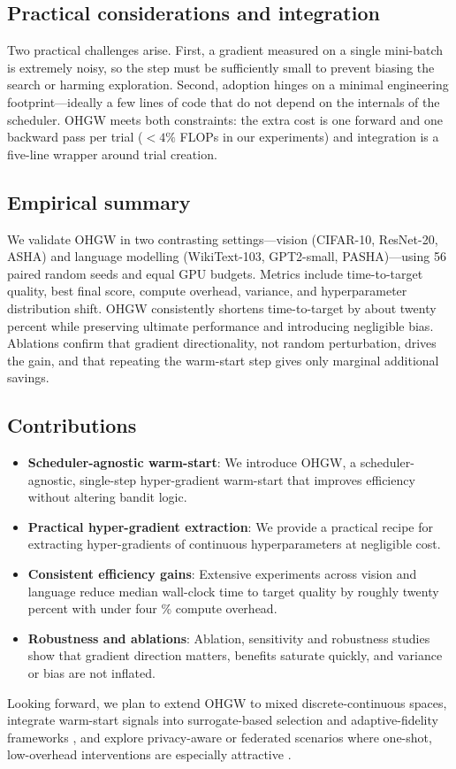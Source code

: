 \documentclass{article}
\begin{document}
\subsection{Practical considerations and integration}
Two practical challenges arise. First, a gradient measured on a single mini-batch is extremely noisy, so the step must be sufficiently small to prevent biasing the search or harming exploration. Second, adoption hinges on a minimal engineering footprint—ideally a few lines of code that do not depend on the internals of the scheduler. OHGW meets both constraints: the extra cost is one forward and one backward pass per trial (\(<4 \%\) FLOPs in our experiments) and integration is a five-line wrapper around trial creation.

\subsection{Empirical summary}
We validate OHGW in two contrasting settings—vision (CIFAR-10, ResNet-20, ASHA) and language modelling (WikiText-103, GPT2-small, PASHA)—using 56 paired random seeds and equal GPU budgets. Metrics include time-to-target quality, best final score, compute overhead, variance, and hyperparameter distribution shift. OHGW consistently shortens time-to-target by about twenty percent while preserving ultimate performance and introducing negligible bias. Ablations confirm that gradient directionality, not random perturbation, drives the gain, and that repeating the warm-start step gives only marginal additional savings.

\subsection{Contributions}
\begin{itemize}
  \item \textbf{Scheduler-agnostic warm-start}: We introduce OHGW, a scheduler-agnostic, single-step hyper-gradient warm-start that improves efficiency without altering bandit logic.
  \item \textbf{Practical hyper-gradient extraction}: We provide a practical recipe for extracting hyper-gradients of continuous hyperparameters at negligible cost.
  \item \textbf{Consistent efficiency gains}: Extensive experiments across vision and language reduce median wall-clock time to target quality by roughly twenty percent with under four \% compute overhead.
  \item \textbf{Robustness and ablations}: Ablation, sensitivity and robustness studies show that gradient direction matters, benefits saturate quickly, and variance or bias are not inflated.
\end{itemize}
Looking forward, we plan to extend OHGW to mixed discrete-continuous spaces, integrate warm-start signals into surrogate-based selection \cite{khazi-2023-deep} and adaptive-fidelity frameworks \cite{jiang-2024-efficient}, and explore privacy-aware or federated scenarios where one-shot, low-overhead interventions are especially attractive \cite{panda-2022-new,khodak-2021-federated}.
\end{document}
